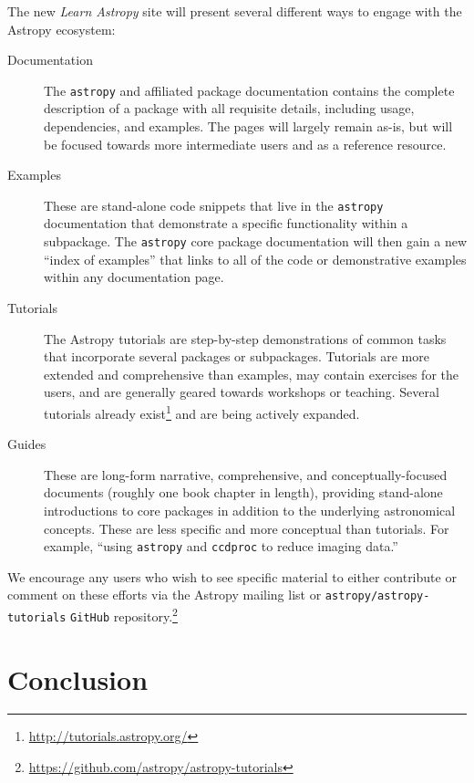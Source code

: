 \documentclass[modern]{aastex62}
\newcommand{\package}[1]{\texttt{#1}\xspace}
\newcommand{\github}{\package{GitHub}}
\newcommand{\astropy}{Astropy\xspace}
\newcommand{\astropypkg}{\package{astropy}}
\begin{document}
The new \emph{Learn Astropy} site will present several different ways to engage
with the \astropy ecosystem:
\begin{description}
    \item[Documentation] The \astropypkg and affiliated package documentation
        contains the complete description of a package with all requisite
        details, including usage, dependencies, and examples.
        The pages will largely remain as-is, but will be focused towards more
        intermediate users and as a reference resource.
    \item[Examples] These are stand-alone code snippets that live in the
        \astropypkg documentation that demonstrate a specific functionality
        within a subpackage.
        The \astropypkg core package documentation will then gain a new ``index
        of examples'' that links to all of the code or demonstrative examples
        within any documentation page.
    \item[Tutorials] The \astropy tutorials are step-by-step demonstrations of
        common tasks that incorporate several packages or subpackages.
        Tutorials are more extended and comprehensive than examples, may contain
        exercises for the users, and are generally geared towards workshops or
        teaching.
        Several tutorials already
        exist\footnote{\url{http://tutorials.astropy.org/}} and are being
        actively expanded.
    \item[Guides] These are long-form narrative, comprehensive, and
        conceptually-focused documents (roughly one book chapter in length),
        providing stand-alone introductions to core packages in addition to the
        underlying astronomical concepts.
        These are less specific and more conceptual than tutorials.
        For example, ``using \astropypkg and \package{ccdproc} to reduce imaging
        data.''
\end{description}
We encourage any users who wish to see specific material to either contribute or
comment on these efforts via the \astropy mailing list or \package{astropy/astropy-tutorials}
\github repository.\footnote{\url{https://github.com/astropy/astropy-tutorials}}

\section{Conclusion}
\label{sec:conclusion}
\end{document}
